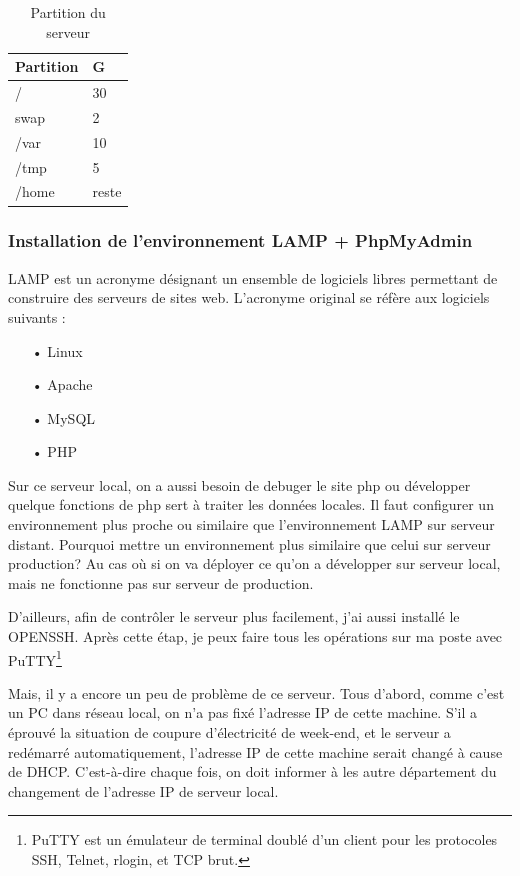\begin{table}[htbp]
\centering
\begin{tabular}{ll}
  \toprule
  Partition & G\\
  \midrule
	/ & 30 \\ 
	\hline 
	swap & 2 \\ 
	\hline 
	/var & 10 \\ 
	\hline 
	/tmp & 5 \\ 
	\hline 
	/home & reste \\
  \bottomrule
\end{tabular}
 \caption{\label{tab:Partition du serveur}Partition du serveur}
\end{table}

\subsubsection{Installation de l'environnement LAMP + PhpMyAdmin}
LAMP est un acronyme désignant un ensemble de logiciels libres permettant de construire des serveurs de sites web. L'acronyme original se réfère aux logiciels suivants :
\begin{itemize}
\item[•] Linux 
\item[•] Apache 
\item[•] MySQL 
\item[•] PHP 
\end{itemize}
Sur ce serveur local, on a aussi besoin de debuger le site php ou développer quelque fonctions de php sert à traiter les données locales. Il faut configurer un environnement plus proche ou similaire que l'environnement LAMP sur serveur distant. Pourquoi mettre un environnement plus similaire que celui sur serveur production? Au cas où si on va déployer ce qu'on a développer sur serveur local, mais ne fonctionne pas sur serveur de production. 

D'ailleurs, afin de contrôler le serveur plus facilement, j'ai aussi installé le OPENSSH. Après cette étap, je peux faire tous les opérations sur ma poste avec PuTTY\footnote{PuTTY est un émulateur de terminal doublé d'un client pour les protocoles SSH, Telnet, rlogin, et TCP brut.}

Mais, il y a encore un peu de problème de ce serveur. Tous d'abord, comme c'est un PC dans réseau local, on n'a pas fixé  l'adresse IP de cette machine. S'il a éprouvé la situation de coupure d'électricité de week-end, et le serveur a redémarré automatiquement, l'adresse IP de cette machine serait changé à cause de DHCP. C'est-à-dire chaque fois, on doit informer à les autre département du changement de l'adresse IP de serveur local.

